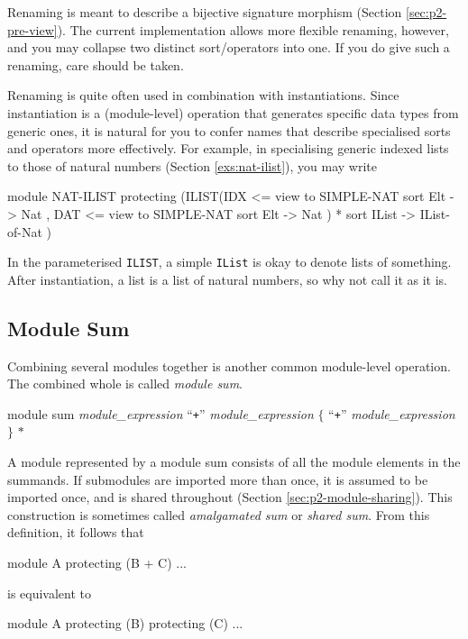 \documentclass[a4paper]{memoir}
\begin{document}
\begin{warning}
  Renaming is meant to describe a bijective signature
  morphism (Section \ref{sec:p2-pre-view}). The current implementation allows
  more flexible renaming, however, and you may collapse
  two distinct sort/operators into one. If you do give such a renaming,
  care should be taken.
\end{warning}

Renaming is quite often used in combination with instantiations.
Since instantiation is a (module-level) operation that generates
specific data types from generic ones, it is natural for you to
confer names that describe specialised sorts and operators more
effectively. For example, in specialising generic indexed lists to those of
natural numbers (Section \ref{exs:nat-ilist}), you may write
\begin{vvtm}
\begin{ccode}
  module NAT-ILIST {
    protecting (ILIST(IDX <= view to SIMPLE-NAT { sort Elt -> Nat },
                      DAT <= view to SIMPLE-NAT { sort Elt -> Nat })
                  * { sort IList -> IList-of-Nat })
  }
\end{ccode}
\end{vvtm}
In the parameterised \verb|ILIST|, a simple \verb|IList| is okay to
denote lists of something. After instantiation, a list is a list
of natural numbers, so why not call it as it is.

\subsection{Module Sum}

Combining several modules together is another common module-level
operation. The combined whole is called {\em module sum}.

\begin{bsyntax} module sum  \Hline
\textit{module\_expression} ``\texttt{+}'' \textit{module\_expression} $\{$ ``\texttt{+}'' \textit{module\_expression} $\}$ $*$
\end{bsyntax}

A module represented by a module sum consists of all the module elements in
the summands. If submodules are imported more than once, it is assumed to
be imported once, and is shared throughout
(Section \ref{sec:p2-module-sharing}).
This construction is sometimes called {\em amalgamated sum} or
{\em shared sum}.
From this definition, it follows that
\begin{vvtm}
\begin{ccode}
  module A { protecting (B + C) ... }
\end{ccode}
\end{vvtm}
is equivalent to
\begin{vvtm}
\begin{ccode}
  module A { protecting (B) protecting (C) ... }
\end{ccode}
\end{vvtm}
\end{document}
